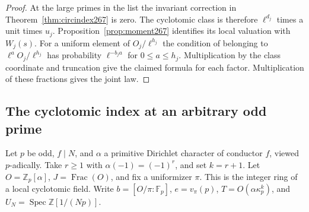 \documentclass[a4paper,11pt]{article}
\theoremstyle{definition}
\theoremstyle{remark}
\numberwithin{equation}{section}
\begin{document}
\begin{proof}
At the large primes in the list the invariant correction in
Theorem~\ref{thm:circindex267} is zero. The cyclotomic class is
therefore \(\ell^{d_j}\) times a unit times \(u_j\).
Proposition~\ref{prop:moment267} identifies its local valuation
with \(W_j(s)\). For a uniform element of \(O_j/\ell^{h_j}\)
the condition of belonging to \(\ell^aO_j/\ell^{h_j}\) has
probability \(\ell^{-b_j a}\) for \(0\le a\le h_j\).
Multiplication by the class coordinate and truncation give the
claimed formula for each factor. Multiplication of these
fractions gives the joint law.
\end{proof}

\subsection{The cyclotomic index at an arbitrary odd prime}\label{nav:III-48}
Let \(p\) be odd, \(f\mid N\), and \(\alpha\) a primitive
Dirichlet character of conductor \(f\), viewed \(p\)-adically.
Take \(r\ge1\) with \(\alpha(-1)=(-1)^r\), and set \(k=r+1\).
Let \(O=\mathbb Z_p[\alpha]\), \(J=\operatorname{Frac}(O)\),
and fix a uniformizer \(\pi\). This is the integer ring of a
local cyclotomic field. Write \(b=[O/\pi:\mathbb F_p]\),
\(e=v_\pi(p)\), \(T=O(\alpha\kappa_p^k)\), and
\(U_N=\operatorname{Spec}\mathbb Z[1/(Np)]\).
\end{document}
